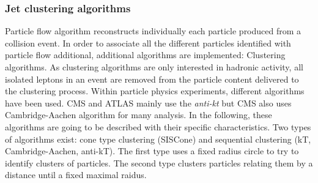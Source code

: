 \subsubsection{Jet clustering algorithms}

Particle flow algorithm reconstructs individually each particle produced from a collision event. In order to associate all the different particles identified with particle flow additional, additional algorithms are implemented: Clustering algorithms. As clustering algorithms are only interested in hadronic activity, all isolated leptons in an event are removed from the particle content delivered to the clustering process. Within particle physics experiments, different algorithms have been used. CMS and ATLAS mainly use the \textit{anti-kt} but CMS also uses Cambridge-Aachen algorithm for many analysis. In the following, these algorithms are going to be described with their specific characteristics. Two types of algorithms exist: cone type clustering (SISCone) and sequential clustering (kT, Cambridge-Aachen, anti-kT). The first type uses a fixed radius circle to try to identify clusters of particles. The second type clusters particles relating them by a distance until a fixed maximal raidus. 


